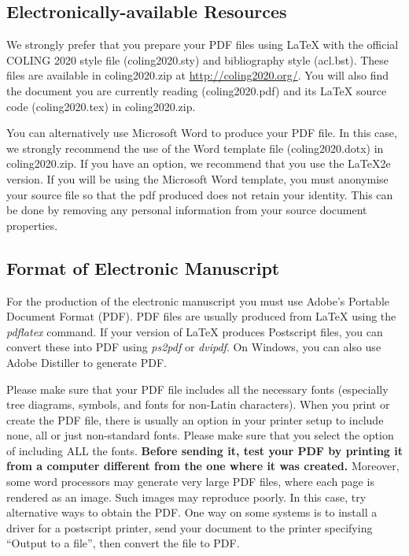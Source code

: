 \documentclass[11pt]{article}
\begin{document}
\subsection{Electronically-available Resources}

We strongly prefer that you prepare your PDF files using \LaTeX{} with
the official COLING 2020 style file (coling2020.sty) and bibliography style
(acl.bst). These files are available in coling2020.zip 
at \url{http://coling2020.org/}.
You will also find the document
you are currently reading (coling2020.pdf) and its \LaTeX{} source code
(coling2020.tex) in coling2020.zip. 

You can alternatively use Microsoft Word to produce your PDF file. In
this case, we strongly recommend the use of the Word template file
(coling2020.dotx) in coling2020.zip. If you have an option, we
recommend that you use the \LaTeX2e{} version. If you will be
  using the Microsoft Word template, you must anonymise
  your source file so that the pdf produced does not retain your
  identity.  This can be done by removing any personal information
from your source document properties.



\subsection{Format of Electronic Manuscript}
\label{sect:pdf}

For the production of the electronic manuscript you must use Adobe's
Portable Document Format (PDF). PDF files are usually produced from
\LaTeX{} using the \textit{pdflatex} command. If your version of
\LaTeX{} produces Postscript files, you can convert these into PDF
using \textit{ps2pdf} or \textit{dvipdf}. On Windows, you can also use
Adobe Distiller to generate PDF.

Please make sure that your PDF file includes all the necessary fonts
(especially tree diagrams, symbols, and fonts for non-Latin characters). 
When you print or create the PDF file, there is usually
an option in your printer setup to include none, all or just
non-standard fonts.  Please make sure that you select the option of
including ALL the fonts. \textbf{Before sending it, test your PDF by
  printing it from a computer different from the one where it was
  created.} Moreover, some word processors may generate very large PDF
files, where each page is rendered as an image. Such images may
reproduce poorly. In this case, try alternative ways to obtain the
PDF. One way on some systems is to install a driver for a postscript
printer, send your document to the printer specifying ``Output to a
file'', then convert the file to PDF.
\end{document}
